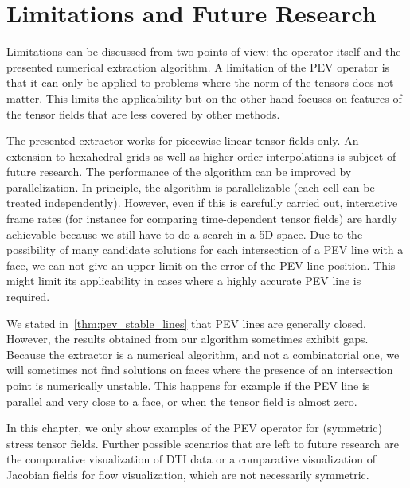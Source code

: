 
%
\section{Limitations and Future Research} %
\label{sec:pev_limitations}
% 
Limitations can be discussed from two points of view:
%
the operator itself and the presented numerical extraction algorithm.
%
A limitation of the \ac{PEV} operator is that it can only be applied to problems
where the norm of the tensors does not matter.
%
This limits the applicability but on the other hand focuses on features of the
tensor fields that are less covered by other methods.
%

%
The presented extractor works for piecewise linear tensor fields only.
%
An extension to hexahedral grids as well as higher order interpolations is
subject of future research.
%
The performance of the algorithm can be improved by parallelization.
%
In principle, the algorithm is parallelizable (each cell can be treated
independently).
%
However, even if this is carefully carried out, interactive frame rates (for
instance for comparing time-dependent tensor fields) are hardly achievable
because we still have to do a search in a \ac{5D} space.
%
Due to the possibility of many candidate solutions for each intersection of a
\ac{PEV} line with a face, we can not give an upper limit on the error of the
\ac{PEV} line position.
%
This might limit its applicability in cases where a highly accurate \ac{PEV} line is
required.
%

%
%
We stated in~\cref{thm:pev_stable_lines} that \ac{PEV} lines are generally closed.
%
However, the results obtained from our algorithm sometimes exhibit gaps.
%
Because the extractor is a numerical algorithm, and not a combinatorial one, we
will sometimes not find solutions on faces where the presence of an intersection
point is numerically unstable.
%
This happens for example if the \ac{PEV} line is parallel and very close to a face,
or when the tensor field is almost zero.
%
%

%
In this chapter, we only show examples of the \ac{PEV} operator for (symmetric)
stress tensor fields.
%
Further possible scenarios that are left to future research are the comparative
visualization of \ac{DTI} data or a comparative visualization of Jacobian fields
for flow visualization, which are not necessarily symmetric.
%